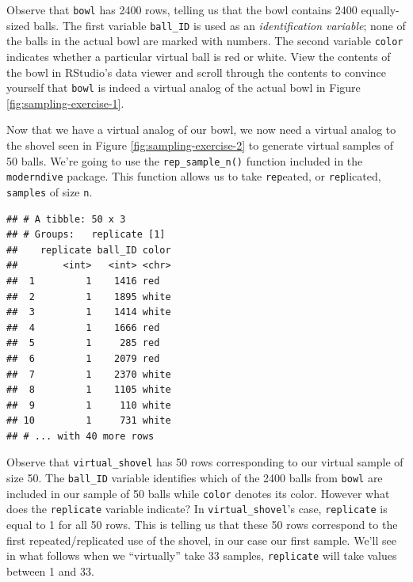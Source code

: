 \documentclass[
]{book}
\newenvironment{Shaded}{\begin{snugshade}}{\end{snugshade}}
\newcommand{\DataTypeTok}[1]{\textcolor[rgb]{0.13,0.29,0.53}{#1}}
\newcommand{\DecValTok}[1]{\textcolor[rgb]{0.00,0.00,0.81}{#1}}
\newcommand{\KeywordTok}[1]{\textcolor[rgb]{0.13,0.29,0.53}{\textbf{#1}}}
\newcommand{\NormalTok}[1]{#1}
\newcommand{\OperatorTok}[1]{\textcolor[rgb]{0.81,0.36,0.00}{\textbf{#1}}}
\newcommand{\StringTok}[1]{\textcolor[rgb]{0.31,0.60,0.02}{#1}}
\begin{document}
Observe that \texttt{bowl} has 2400 rows, telling us that the bowl contains 2400 equally-sized balls. The first variable \texttt{ball\_ID} is used as an \emph{identification variable}; none of the balls in the actual bowl are marked with numbers. The second variable \texttt{color} indicates whether a particular virtual ball is red or white. View the contents of the bowl in RStudio's data viewer and scroll through the contents to convince yourself that \texttt{bowl} is indeed a virtual analog of the actual bowl in Figure \ref{fig:sampling-exercise-1}.

Now that we have a virtual analog of our bowl, we now need a virtual analog to the shovel seen in Figure \ref{fig:sampling-exercise-2} to generate virtual samples of 50 balls. We're going to use the \texttt{rep\_sample\_n()} function included in the \texttt{moderndive} package. This function allows us to take \texttt{rep}eated, or \texttt{rep}licated, \texttt{samples} of size \texttt{n}.

\begin{Shaded}
\end{Shaded}

\begin{verbatim}
## # A tibble: 50 x 3
## # Groups:   replicate [1]
##    replicate ball_ID color
##        <int>   <int> <chr>
##  1         1    1416 red  
##  2         1    1895 white
##  3         1    1414 white
##  4         1    1666 red  
##  5         1     285 red  
##  6         1    2079 red  
##  7         1    2370 white
##  8         1    1105 white
##  9         1     110 white
## 10         1     731 white
## # ... with 40 more rows
\end{verbatim}

Observe that \texttt{virtual\_shovel} has 50 rows corresponding to our virtual sample of size 50. The \texttt{ball\_ID} variable identifies which of the 2400 balls from \texttt{bowl} are included in our sample of 50 balls while \texttt{color} denotes its color. However what does the \texttt{replicate} variable indicate? In \texttt{virtual\_shovel}'s case, \texttt{replicate} is equal to 1 for all 50 rows. This is telling us that these 50 rows correspond to the first repeated/replicated use of the shovel, in our case our first sample. We'll see in what follows when we ``virtually'' take 33 samples, \texttt{replicate} will take values between 1 and 33.
\end{document}
